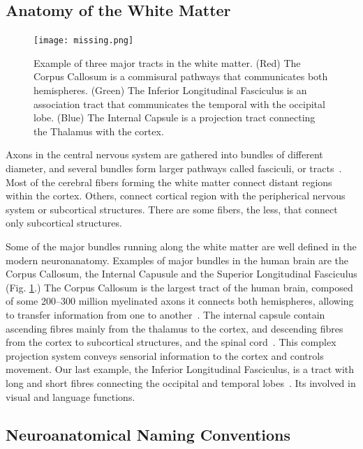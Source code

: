 \subsection{Anatomy of the White Matter}

\begin{figure}[t]
    \texttt{[image: missing.png]}
    \caption{Example of three major tracts in the white matter. (Red) The Corpus
             Callosum is a commisural pathways that communicates both hemispheres.
             (Green) The Inferior Longitudinal Fasciculus is an association tract
             that communicates the temporal with the occipital lobe. (Blue) The
             Internal Capsule is a projection tract connecting the Thalamus
             with the cortex.}
    \label{fig:white_anatomy}
\end{figure}

Axons in the central nervous system are gathered into bundles of different
diameter, and several bundles form larger pathways called fasciculi, or tracts~\cite{Catani2012}.
Most of the cerebral fibers forming the white matter connect distant regions 
within the cortex. Others, connect cortical region with the peripherical nervous
system or subcortical structures. There are some fibers, the less, that connect
only subcortical structures.

Some of the major bundles running along the white matter are well defined in the
modern neuronanatomy. Examples of major bundles in the human brain are the
Corpus Callosum, the Internal Capusule and the Superior Longitudinal Fasciculus
(Fig. \ref{fig:white_anatomy}.)
The Corpus Callosum is the largest tract of the human brain, composed of some
200–300 million myelinated axons it connects both hemispheres, allowing to
transfer information from one to another~\cite{Catani2012}. The internal capsule
contain ascending fibres mainly from the thalamus to the cortex, and descending
fibres from the cortex to subcortical structures, and the spinal cord~\cite{Catani2012}.
This complex projection system conveys sensorial information to the cortex and 
controls movement. Our last example, the Inferior Longitudinal Fasciculus, is
a tract with long and short fibres connecting the occipital and temporal lobes~\cite{Catani2012}.
Its involved in visual and language functions.


\subsection{Neuroanatomical Naming Conventions}

